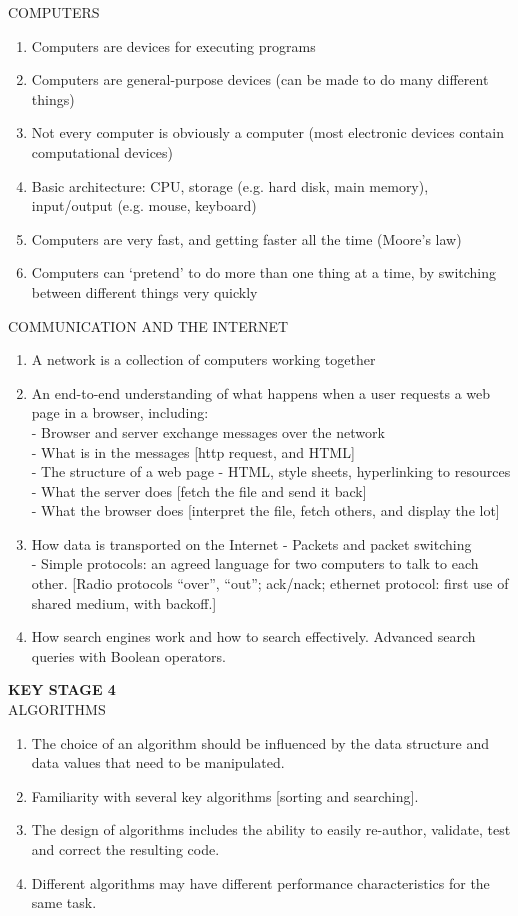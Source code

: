 COMPUTERS
\begin{enumerate}
\item Computers are devices for executing programs
\item Computers are general-purpose devices (can be made to do many different things)
\item Not every computer is obviously a computer (most electronic devices contain
computational devices)
\item Basic architecture: CPU, storage (e.g. hard disk, main memory), input/output (e.g.
mouse, keyboard)
\item Computers are very fast, and getting faster all the time (Moore’s law)
\item Computers can ‘pretend’ to do more than one thing at a time, by switching between
different things very quickly
\end{enumerate}

COMMUNICATION AND THE INTERNET
\begin{enumerate}
\item A network is a collection of computers working together
\item An end-to-end understanding of what happens when a user requests a web page in a
browser, including:\\
- Browser and server exchange messages over the network\\
- What is in the messages [http request, and HTML]\\
- The structure of a web page - HTML, style sheets, hyperlinking to resources\\
- What the server does [fetch the file and send it back]\\
- What the browser does [interpret the file, fetch others, and display the lot]\\
\item How data is transported on the Internet
- Packets and packet switching\\
- Simple protocols: an agreed language for two computers to talk to each
other. [Radio protocols “over”, “out”; ack/nack; ethernet protocol: first use
of shared medium, with backoff.] \\
\item How search engines work and how to search effectively. Advanced search queries
with Boolean operators.
\end{enumerate}

\textbf{KEY STAGE 4}\\
ALGORITHMS
\begin{enumerate}
\item The choice of an algorithm should be influenced by the data structure and data
values that need to be manipulated.
\item Familiarity with several key algorithms [sorting and searching].
\item The design of algorithms includes the ability to easily re-author, validate, test and
correct the resulting code.
\item Different algorithms may have different performance characteristics for the same
task. 
\end{enumerate}

